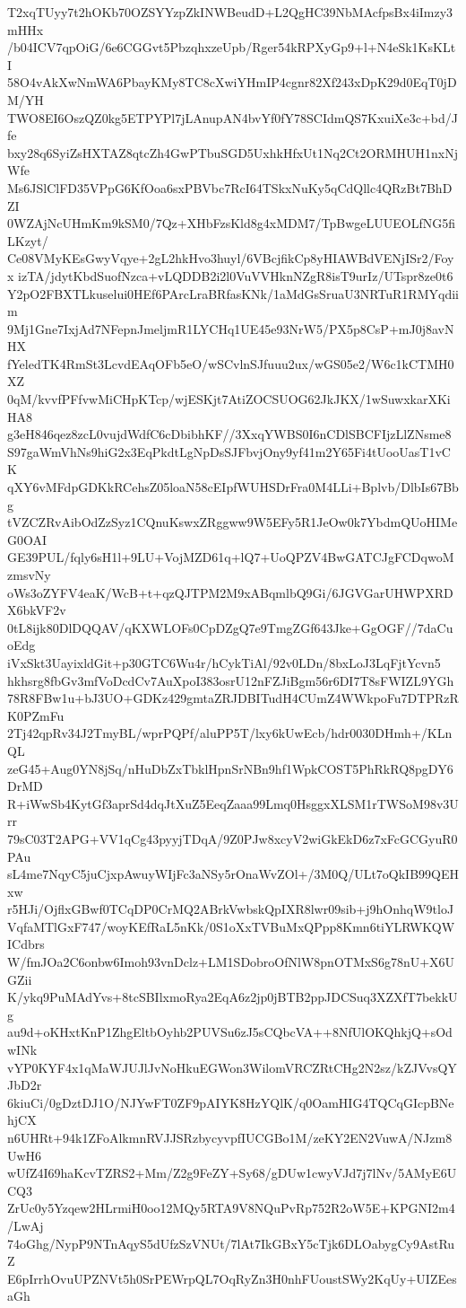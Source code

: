 T2xqTUyy7t2hOKb70OZSYYzpZkINWBeudD+L2QgHC39NbMAcfpsBx4iImzy3mHHx
/b04ICV7qpOiG/6e6CGGvt5PbzqhxzeUpb/Rger54kRPXyGp9+l+N4eSk1KsKLtI
58O4vAkXwNmWA6PbayKMy8TC8cXwiYHmIP4cgnr82Xf243xDpK29d0EqT0jDM/YH
TWO8EI6OszQZ0kg5ETPYPl7jLAnupAN4bvYf0fY78SCIdmQS7KxuiXe3c+bd/Jfe
bxy28q6SyiZsHXTAZ8qtcZh4GwPTbuSGD5UxhkHfxUt1Nq2Ct2ORMHUH1nxNjWfe
Ms6JSlClFD35VPpG6KfOoa6sxPBVbc7RcI64TSkxNuKy5qCdQllc4QRzBt7BhDZI
0WZAjNcUHmKm9kSM0/7Qz+XHbFzsKld8g4xMDM7/TpBwgeLUUEOLfNG5fiLKzyt/
Ce08VMyKEsGwyVqye+2gL2hkHvo3huyl/6VBcjfikCp8yHIAWBdVENjISr2/Foyx
izTA/jdytKbdSuofNzca+vLQDDB2i2l0VuVVHknNZgR8isT9urIz/UTspr8ze0t6
Y2pO2FBXTLkuselui0HEf6PArcLraBRfasKNk/1aMdGsSruaU3NRTuR1RMYqdiim
9Mj1Gne7IxjAd7NFepnJmeljmR1LYCHq1UE45e93NrW5/PX5p8CsP+mJ0j8avNHX
fYeledTK4RmSt3LcvdEAqOFb5eO/wSCvlnSJfuuu2ux/wGS05e2/W6c1kCTMH0XZ
0qM/kvvfPFfvwMiCHpKTcp/wjESKjt7AtiZOCSUOG62JkJKX/1wSuwxkarXKiHA8
g3eH846qez8zcL0vujdWdfC6cDbibhKF//3XxqYWBS0I6nCDlSBCFIjzLlZNsme8
S97gaWmVhNs9hiG2x3EqPkdtLgNpDsSJFbvjOny9yf41m2Y65Fi4tUooUasT1vCK
qXY6vMFdpGDKkRCehsZ05loaN58cEIpfWUHSDrFra0M4LLi+Bplvb/DlbIs67Bbg
tVZCZRvAibOdZzSyz1CQnuKswxZRggww9W5EFy5R1JeOw0k7YbdmQUoHIMeG0OAI
GE39PUL/fqly6sH1l+9LU+VojMZD61q+lQ7+UoQPZV4BwGATCJgFCDqwoMzmsvNy
oWs3oZYFV4eaK/WcB+t+qzQJTPM2M9xABqmlbQ9Gi/6JGVGarUHWPXRDX6bkVF2v
0tL8ijk80DlDQQAV/qKXWLOFs0CpDZgQ7e9TmgZGf643Jke+GgOGF//7daCuoEdg
iVxSkt3UayixldGit+p30GTC6Wu4r/hCykTiAl/92v0LDn/8bxLoJ3LqFjtYcvn5
hkhsrg8fbGv3mfVoDcdCv7AuXpoI383osrU12nFZJiBgm56r6DI7T8sFWIZL9YGh
78R8FBw1u+bJ3UO+GDKz429gmtaZRJDBITudH4CUmZ4WWkpoFu7DTPRzRK0PZmFu
2Tj42qpRv34J2TmyBL/wprPQPf/aluPP5T/lxy6kUwEcb/hdr0030DHmh+/KLnQL
zeG45+Aug0YN8jSq/nHuDbZxTbklHpnSrNBn9hf1WpkCOST5PhRkRQ8pgDY6DrMD
R+iWwSb4KytGf3aprSd4dqJtXuZ5EeqZaaa99Lmq0HsggxXLSM1rTWSoM98v3Urr
79sC03T2APG+VV1qCg43pyyjTDqA/9Z0PJw8xcyV2wiGkEkD6z7xFcGCGyuR0PAu
sL4me7NqyC5juCjxpAwuyWIjFc3aNSy5rOnaWvZOl+/3M0Q/ULt7oQkIB99QEHxw
r5HJi/OjflxGBwf0TCqDP0CrMQ2ABrkVwbskQpIXR8lwr09sib+j9hOnhqW9tloJ
VqfaMTlGxF747/woyKEfRaL5nKk/0S1oXxTVBuMxQPpp8Kmn6tiYLRWKQWICdbrs
W/fmJOa2C6onbw6Imoh93vnDclz+LM1SDobroOfNlW8pnOTMxS6g78nU+X6UGZii
K/ykq9PuMAdYvs+8tcSBIlxmoRya2EqA6z2jp0jBTB2ppJDCSuq3XZXfT7bekkUg
au9d+oKHxtKnP1ZhgEltbOyhb2PUVSu6zJ5sCQbcVA++8NfUlOKQhkjQ+sOdwINk
vYP0KYF4x1qMaWJUJlJvNoHkuEGWon3WilomVRCZRtCHg2N2sz/kZJVvsQYJbD2r
6kiuCi/0gDztDJ1O/NJYwFT0ZF9pAIYK8HzYQlK/q0OamHIG4TQCqGIcpBNehjCX
n6UHRt+94k1ZFoAlkmnRVJJSRzbycyvpfIUCGBo1M/zeKY2EN2VuwA/NJzm8UwH6
wUfZ4I69haKcvTZRS2+Mm/Z2g9FeZY+Sy68/gDUw1cwyVJd7j7lNv/5AMyE6UCQ3
ZrUc0y5Yzqew2HLrmiH0oo12MQy5RTA9V8NQuPvRp752R2oW5E+KPGNI2m4/LwAj
74oGhg/NypP9NTnAqyS5dUfzSzVNUt/7lAt7IkGBxY5cTjk6DLOabygCy9AstRuZ
E6pIrrhOvuUPZNVt5h0SrPEWrpQL7OqRyZn3H0nhFUoustSWy2KqUy+UIZEesaGh
